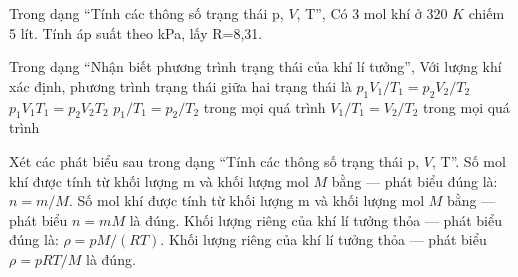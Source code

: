 \begin{ex}
Trong dạng “Tính các thông số trạng thái p, $V$, T”, Có 3 mol khí ở 320 $K$ chiếm 5 lít. Tính áp suất theo kPa, lấy R=8,31.
\end{ex}

\begin{ex}
Trong dạng “Nhận biết phương trình trạng thái của khí lí tưởng”, Với lượng khí xác định, phương trình trạng thái giữa hai trạng thái là
\choice
{\True $p_1V_1/T_1=p_2V_2/T_2$}
{$p_1V_1T_1=p_2V_2T_2$}
{$p_1/T_1=p_2/T_2$ trong mọi quá trình}
{$V_1/T_1=V_2/T_2$ trong mọi quá trình}
\end{ex}

\begin{ex}
Xét các phát biểu sau trong dạng “Tính các thông số trạng thái p, $V$, T”.
\choiceTF
{\True Số mol khí được tính từ khối lượng m và khối lượng mol $M$ bằng — phát biểu đúng là: $n=m/M$.}
{Số mol khí được tính từ khối lượng m và khối lượng mol $M$ bằng — phát biểu $n=mM$ là đúng.}
{\True Khối lượng riêng của khí lí tưởng thỏa — phát biểu đúng là: $\rho=pM/(RT)$.}
{Khối lượng riêng của khí lí tưởng thỏa — phát biểu $\rho=pRT/M$ là đúng.}
\end{ex}

